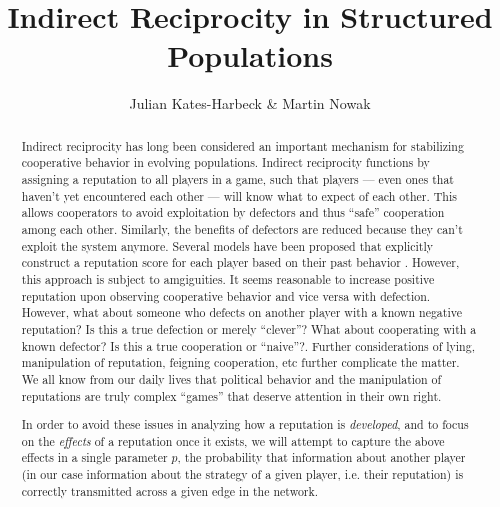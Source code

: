 \documentclass{article}
\title{Indirect Reciprocity in Structured Populations}
\author{Julian Kates-Harbeck \& Martin Nowak}
\renewcommand{\=}[1]{\stackrel{#1}{=}} %
\begin{document}
    
    
    \maketitle
    

    \begin{abstract}

Indirect reciprocity has long been considered \cite{nowak2006five} an important mechanism for stabilizing cooperative behavior in evolving populations. Indirect reciprocity functions by assigning a reputation to all players in a game, such that players --- even ones that haven't yet encountered each other --- will know what to expect of each other. This allows cooperators to avoid exploitation by defectors and thus ``safe'' cooperation among each other. Similarly, the benefits of defectors are reduced because they can't exploit the system anymore. Several models have been proposed that explicitly construct a reputation score for each player based on their past behavior \cite{nowak2005evolution}. However, this approach is subject to amgiguities. It seems reasonable to increase positive reputation upon observing cooperative behavior and vice versa with defection. However, what about someone who defects on another player with a known negative reputation? Is this a true defection or merely ``clever''? What about cooperating with a known defector? Is this a true cooperation or ``naive''?. Further considerations of lying, manipulation of reputation, feigning cooperation, etc further complicate the matter. We all know from our daily lives that political behavior and the manipulation of reputations are truly complex ``games'' that deserve attention in their own right.

In order to avoid these issues in analyzing how a reputation is \emph{developed}, and to focus on the \emph{effects} of a reputation once it exists, we will attempt to capture the above effects in a single parameter $p$, the probability that information about another player (in our case information about the strategy of a given player, i.e. their reputation) is correctly transmitted across a given edge in the network.


\end{abstract}
\end{document}
